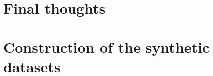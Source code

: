 ﻿\documentclass[ppgc,tese,english]{iiufrgs}
\begin{document}

%     

%     


\chapter{Final thoughts}
    \label{chpt:closing}
    

%

%





\appendix



\chapter{Construction of the synthetic datasets}
    \label{app:dataset-creation}
    

\end{document}

